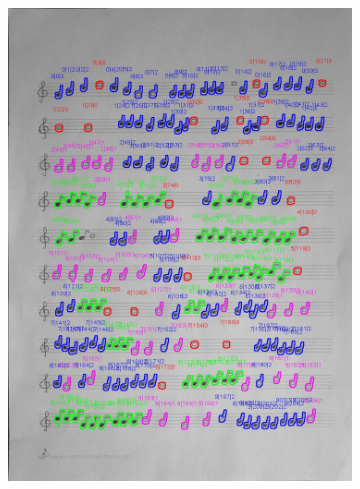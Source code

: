 \documentclass[11pt]{article}
\begin{document}
\begin{figure}[H]
    \centering
    \begin{subfigure}{.5\textwidth}
        \centering
        \graphicspath{ {blobs/} }
        \includegraphics[width=\linewidth]{9_cnts.jpg}
        \label{fig:sub1}
    \end{subfigure}%
    \begin{subfigure}{.5\textwidth}
        \centering
        \graphicspath{ {blobs/} }

\end{subfigure}
\end{figure}
\end{document}
